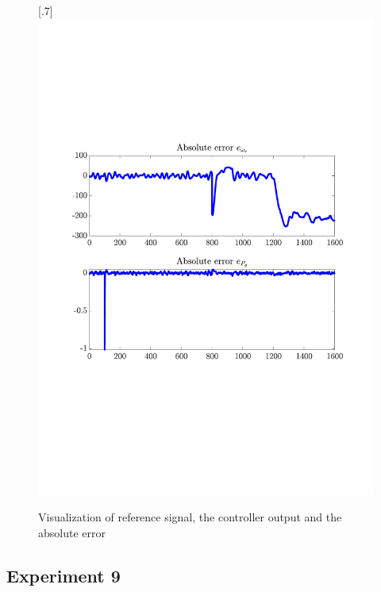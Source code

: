 \begin{figure}[H]
[.7\textwidth]{\includegraphics[width=1\linewidth, scale=1, trim=55 230 55 120,clip]{fig/Open_loop/exp_8_error.pdf}}
    \caption{Visualization of reference signal, the controller output and the absolute error}
    \label{fig:app:cl_results:exp8}
\end{figure}


\subsection{Experiment 9}

